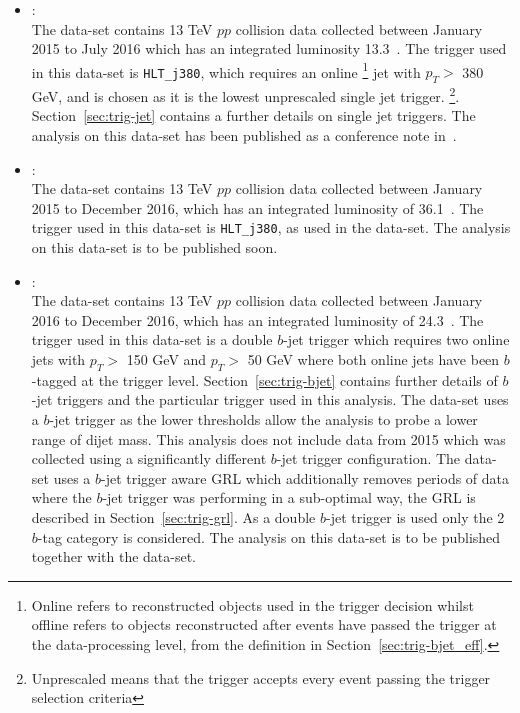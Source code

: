 \begin{itemize}[leftmargin=*]
\item\textbf{\summer{}}: \\
  The \summer{} data-set contains 13 TeV $pp$ collision data collected
  between January 2015 to July 2016 which has an integrated luminosity 13.3~\ifb.
  The trigger used in this data-set is \verb|HLT_j380|,
  which requires an online
  \footnote{Online refers to reconstructed objects used in the trigger decision
  whilst offline refers to objects reconstructed after events have passed the trigger at the data-processing level,
  from the definition in Section~\ref{sec:trig-bjet_eff}.}  jet with $p_T >$ 380 GeV, 
  and is chosen as it is the lowest unprescaled single jet trigger.
  \footnote{Unprescaled means that the trigger accepts every event passing the trigger selection criteria}.
  Section~\ref{sec:trig-jet} contains a further details on single jet triggers.
  The analysis on this data-set has been published as a conference note in~\cite{dibjet-ichep_conf}. \\
  
\item\textbf{\hm{}}:\\
  The \hm{} data-set contains 13 TeV $pp$ collision data collected
  between January 2015 to December 2016, which has an integrated luminosity of 36.1~\ifb.
  The trigger used in this data-set is \verb|HLT_j380|, as used in the \summer{} data-set.
  The analysis on this data-set is to be published soon.\\
  
\item\textbf{\lm{}}: \\
  The \lm{} data-set contains 13 TeV $pp$ collision data collected
  between January 2016 to December 2016, which has an integrated luminosity of 24.3~\ifb.
  The trigger used in this data-set is a double $b$-jet trigger 
  which requires two online jets with $p_T >$ 150 GeV and $p_T >$ 50 GeV
  where both online jets have been $b$-tagged at the trigger level.
  Section~\ref{sec:trig-bjet} contains further details of $b$-jet triggers and the particular trigger used in this analysis.
  The \lm{} data-set uses a $b$-jet trigger as the lower \pT{} thresholds allow
  the analysis to probe a lower range of dijet mass.
  This analysis does not include data from 2015 which was collected using a significantly different $b$-jet trigger configuration.
  The \lm{} data-set uses a $b$-jet trigger aware GRL which additionally
  removes periods of data where the $b$-jet trigger was performing in a sub-optimal way,
  the GRL is described in Section~\ref{sec:trig-grl}.
  As a double $b$-jet trigger is used only the 2 $b$-tag category is considered.
  The analysis on this data-set is to be published together with the \hm{} data-set.

\end{itemize}

